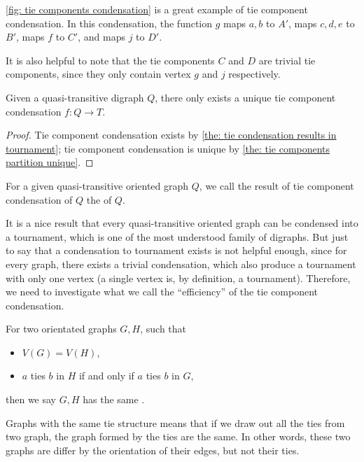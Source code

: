 \cref{fig: tie components condensation} is a great example of
tie component condensation.
In this condensation, the function \(g\) maps \(a, b\) to \(A'\),
maps \(c, d, e\) to \(B'\), maps \(f\) to \(C'\),
and maps \(j\) to \(D'\).

It is also helpful to note that the tie components \(C\) and \(D\)
are trivial tie components,
since they only contain vertex \(g\) and \(j\) respectively.

\begin{corollary}\label{the: tie component condensation unique}
  Given a quasi-transitive digraph \(Q\),
  there only exists a unique tie component condensation
  \(f: Q \to T\).
\end{corollary}
\begin{proof}
  Tie component condensation exists by
  \cref{the: tie condensation results in tournament};
  tie component condensation is unique
  by \cref{the: tie components partition unique}.
\end{proof}

\begin{definition}
  For a given quasi-transitive oriented graph \(Q\),
  we call the result of tie component condensation of \(Q\)
  the  of \(Q\).
\end{definition}

It is a nice result that every
quasi-transitive oriented graph
can be condensed into a tournament,
which is one of the most understood family of digraphs.
But just to say that a condensation to tournament exists
is not helpful enough,
since for every graph, there exists a trivial condensation,
which also produce a tournament with only one vertex
(a single vertex is, by definition, a tournament).
Therefore, we need to investigate what we call
the ``efficiency'' of the tie component condensation.

\begin{definition}
  For two orientated graphs \(G, H\), such that
  \begin{itemize}
    \item \(V(G) = V(H)\),
    \item \(a\) ties \(b\) in \(H\) if and only if
      \(a\) ties \(b\) in \(G\),
  \end{itemize}
  then we say \(G, H\) has the same .
\end{definition}

Graphs with the same tie structure means
that if we draw out all the ties from two graph,
the graph formed by the ties are the same.
In other words, these two graphs are differ
by the orientation of their edges, but not their ties.

